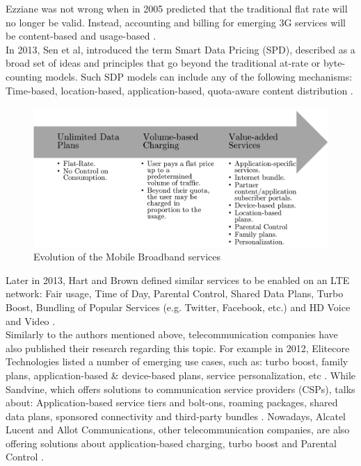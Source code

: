 Ezziane was not wrong when in 2005 predicted that the traditional flat rate will no longer be valid. Instead,  accounting and billing for emerging 3G services will be content-based and usage-based \cite{Ezziane2005}. \\

In 2013, Sen et al, introduced the term Smart Data Pricing (SPD), described as a broad set of ideas and principles that go beyond the traditional at-rate or byte-counting models. Such SDP models can include any of the following mechanisms: Time-based, location-based, application-based, quota-aware content distribution \cite{Sen2013}. \\

\begin{figure}[H]
\centering
\includegraphics[width=1.00\textwidth]{image/Evolution}
\caption{Evolution of the Mobile Broadband services \cite{Kimbler2012}}
\end{figure}

Later in 2013, Hart and Brown defined similar services to be enabled on an LTE network: Fair usage, Time of Day, Parental Control, Shared Data Plans, Turbo Boost, Bundling of Popular Services (e.g. Twitter, Facebook, etc.) and HD Voice and Video \cite{Hart2013}.\\

Similarly to the authors mentioned above, telecommunication companies have also published their research regarding this topic. For example in 2012, Elitecore Technologies listed a number of emerging use cases, such as: turbo boost, family plans, application-based \& device-based plans, service personalization, etc \cite{Elitecore2012}. While Sandvine, which offers solutions to communication service providers (CSPs), talks about: Application-based service tiers and bolt-ons, roaming packages, shared data plans, sponsored connectivity and third-party bundles \cite{Sandvine2014_2}. Nowadays, Alcatel Lucent and Allot Communications, other telecommunication companies, are also offering solutions about application-based charging, turbo boost and Parental Control \cite{Alcatel2014,Allot2014}. \\

